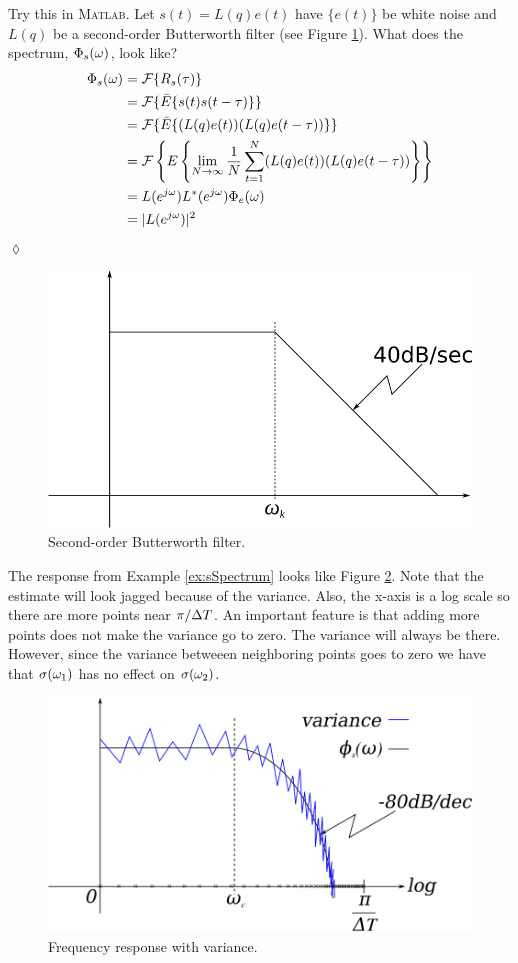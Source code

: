 \begin{example}
\label{ex:sSpectrum}
Try this in \textsc{Matlab}. Let $s(t)=L(q)e(t)$ have $\{e(t)\}$ be white noise and $L(q)$ be a second-order Butterworth filter (see Figure \ref{fig:06butterworthFilter}). What does the spectrum, $\Phi_s(\omega)$, look like?
\begin{align*}
\Phi_s(\omega) &= \mathcal{F}\{R_s(\tau)\} \\
&= \mathcal{F}\{\bar{E}\{s(t)s(t-\tau)\}\} \\
&= \mathcal{F}\{\bar{E}\{(L(q)e(t))(L(q)e(t-\tau))\}\} \\
&= \mathcal{F}\left\lbrace E\left\lbrace\lim_{N\to\infty}\frac{1}{N}\sum_{t=1}^N(L(q)e(t))(L(q)e(t-\tau))\right\rbrace\right\rbrace \\
&= L(e^{j\omega})L^*(e^{j\omega})\Phi_e(\omega) \\
&= |L(e^{j\omega})|^2
\end{align*}
$\lozenge$
\end{example}

\begin{figure}[ht!]
	\centering
	\includegraphics[width=.4\textwidth]{images/06butterworthFilter}
	\caption{Second-order Butterworth filter.}
	\label{fig:06butterworthFilter}
\end{figure}

The response from Example \ref{ex:sSpectrum} looks like Figure \ref{fig:06freqResp}. Note that the estimate will look jagged because of the variance. Also, the x-axis is a log scale so there are more points near $\pi/\Delta T$. An important feature is that adding more points does not make the variance go to zero. The variance will always be there. However, since the variance betweeen neighboring points goes to zero we have that $\sigma(\omega_1)$ has no effect on $\sigma(\omega_2)$.

\begin{figure}[ht!]
	\centering
	\includegraphics[width=.5\textwidth]{images/06freqResp}
	\caption{Frequency response with variance.}
	\label{fig:06freqResp}
\end{figure}

